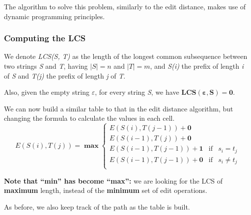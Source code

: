 \documentclass[../main.tex]{subfiles}
\begin{document}
The algorithm to solve this problem, similarly to the edit distance, makes use of dynamic programming principles.

\subsubsection{Computing the LCS}

We denote \emph{LCS(S, T)} as the length of the longest common subsequence between two strings \emph{S} and \emph{T}, having $|S|=n$ and $|T|=m$, and \emph{S(i)} the prefix of length \emph{i} of \emph{S} and \emph{T(j)} the prefix of length \emph{j} of \emph{T}.

Also, given the empty string $\varepsilon$, for every string \emph{S}, we have $\mathbf{LCS(\bm\varepsilon, S)=0}$.

We can now build a similar table to that in the edit distance algorithm, but changing the formula to calculate the values in each cell.
$$
	E(S(i), T(j)) = \bm{\max} \left\{\begin{array}{rcl}
		E(S(i), T(j-1)) + \textbf{0}                              \\
		E(S(i-1), T(j)) + \textbf{0}                              \\
		E(S(i-1), T(j-1)) + \textbf{1} & \mbox{if} & s_i = t_j    \\
		E(S(i-1), T(j-1)) + \textbf{0} & \mbox{if} & s_i \neq t_j \\
	\end{array}
	\right.
$$

\textbf{Note that ``min'' has become ``max'':} we are looking for the LCS of \textbf{maximum} length, instead of the \textbf{minimum} set of edit operations.

As before, we also keep track of the path as the table is built.
\end{document}
